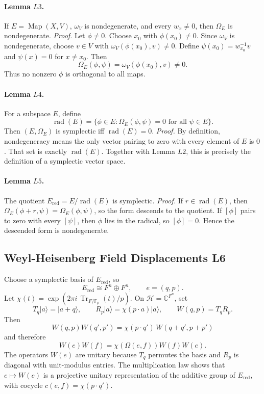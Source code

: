 \paragraph{Lemma \(L3\).}
If \(E=\operatorname{Map}(X,V)\), \(\omega_V\) is nondegenerate, and every
\(w_x\ne0\), then \(\Omega_E\) is nondegenerate.
\emph{Proof.}
Let \(\phi\ne0\).  Choose \(x_0\) with \(\phi(x_0)\ne0\).  Since
\(\omega_V\) is nondegenerate, choose \(v\in V\) with
\(\omega_V(\phi(x_0),v)\ne0\).  Define \(\psi(x_0)=w_{x_0}^{-1}v\) and
\(\psi(x)=0\) for \(x\ne x_0\).  Then
\[
  \Omega_E(\phi,\psi)=\omega_V(\phi(x_0),v)\ne0.
\]
Thus no nonzero \(\phi\) is orthogonal to all maps.

\paragraph{Lemma \(L4\).}
For a subspace \(E\), define
\[
  \operatorname{rad}(E)=\{\phi\in E:\Omega_E(\phi,\psi)=0
  \text{ for all }\psi\in E\}.
\]
Then \((E,\Omega_E)\) is symplectic iff \(\operatorname{rad}(E)=0\).
\emph{Proof.}
By definition, nondegeneracy means the only vector pairing to zero with every
element of \(E\) is \(0\).  That set is exactly \(\operatorname{rad}(E)\).
Together with Lemma \(L2\), this is precisely the definition of a symplectic
vector space.

\paragraph{Lemma \(L5\).}
The quotient \(E_{\mathrm{red}}=E/\operatorname{rad}(E)\) is symplectic.
\emph{Proof.}
If \(r\in\operatorname{rad}(E)\), then
\(\Omega_E(\phi+r,\psi)=\Omega_E(\phi,\psi)\), so the form descends to the
quotient.  If \([\phi]\) pairs to zero with every \([\psi]\), then \(\phi\)
lies in the radical, so \([\phi]=0\).  Hence the descended form is
nondegenerate.

\subsection{Weyl-Heisenberg Field Displacements L6}

Choose a symplectic basis of \(E_{\mathrm{red}}\), so
\[
  E_{\mathrm{red}}\cong F^n\oplus F^n,\qquad e=(q,p).
\]
Let \(\chi(t)=\exp(2\pi i\,\operatorname{Tr}_{F/\mathbb F_p}(t)/p)\).  On
\(\mathcal H=\mathbb C^{F^n}\), set
\[
  T_q|a\rangle=|a+q\rangle,\qquad
  R_p|a\rangle=\chi(p\cdot a)|a\rangle,\qquad
  W(q,p)=T_qR_p .
\]
Then
\[
  W(q,p)W(q',p')
  =
  \chi(p\cdot q')\,W(q+q',p+p')
\]
and therefore
\[
  W(e)W(f)=\chi(\Omega(e,f))W(f)W(e).
\]
The operators \(W(e)\) are unitary because \(T_q\) permutes the basis and
\(R_p\) is diagonal with unit-modulus entries.  The multiplication law shows
that \(e\mapsto W(e)\) is a projective unitary representation of the additive
group of \(E_{\mathrm{red}}\), with cocycle
\(c(e,f)=\chi(p\cdot q')\).

